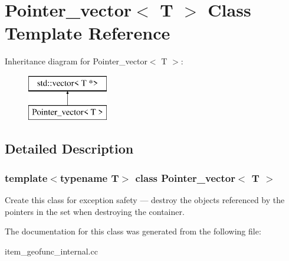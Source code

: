 \hypertarget{classPointer__vector}{}\section{Pointer\+\_\+vector$<$ T $>$ Class Template Reference}
\label{classPointer__vector}
Inheritance diagram for Pointer\+\_\+vector$<$ T $>$\+:\begin{figure}[H]
\begin{center}
\leavevmode
\includegraphics[height=2.000000cm]{classPointer__vector}
\end{center}
\end{figure}


\subsection{Detailed Description}
\subsubsection*{template$<$typename T$>$\newline
class Pointer\+\_\+vector$<$ T $>$}

Create this class for exception safety --- destroy the objects referenced by the pointers in the set when destroying the container. 

The documentation for this class was generated from the following file\+:\begin{DoxyCompactItemize}
\item 
item\+\_\+geofunc\+\_\+internal.\+cc\end{DoxyCompactItemize}

